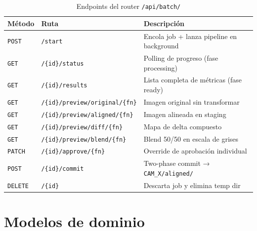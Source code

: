 \begin{table}[H]
\centering
\caption{Endpoints del router \texttt{/api/batch/}}
\label{tab:api-batch}
\begin{tabular}{C{1.5cm} L{5cm} L{6cm}}
\toprule
\textbf{Método} & \textbf{Ruta} & \textbf{Descripción} \\
\midrule
\texttt{POST}  & \texttt{/start}                    & Encola job + lanza pipeline en background \\
\texttt{GET}   & \texttt{/\{id\}/status}             & Polling de progreso (fase processing) \\
\texttt{GET}   & \texttt{/\{id\}/results}            & Lista completa de métricas (fase ready) \\
\texttt{GET}   & \texttt{/\{id\}/preview/original/\{fn\}} & Imagen original sin transformar \\
\texttt{GET}   & \texttt{/\{id\}/preview/aligned/\{fn\}} & Imagen alineada en staging \\
\texttt{GET}   & \texttt{/\{id\}/preview/diff/\{fn\}} & Mapa de delta compuesto \\
\texttt{GET}   & \texttt{/\{id\}/preview/blend/\{fn\}} & Blend 50/50 en escala de grises \\
\texttt{PATCH} & \texttt{/\{id\}/approve/\{fn\}}    & Override de aprobación individual \\
\texttt{POST}  & \texttt{/\{id\}/commit}             & Two-phase commit → \texttt{CAM\_X/aligned/} \\
\texttt{DELETE}& \texttt{/\{id\}}                   & Descarta job y elimina temp dir \\
\bottomrule
\end{tabular}
\end{table}

\section{Modelos de dominio}

